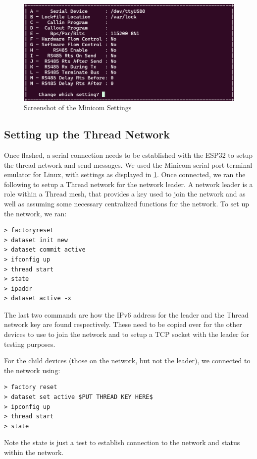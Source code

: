 \documentclass[letterpaper,twocolumn,10pt]{article}
\begin{document}
\begin{figure}
    \centering
    \includegraphics[width=0.75\linewidth]{Figures/minicom_screenshot.png}
    \caption{Screenshot of the Minicom Settings}
    \label{fig:minicom}
\end{figure}

\subsection{Setting up the Thread Network}

Once flashed, a serial connection needs to be established with the ESP32 to setup the thread network and send messages. We used the Minicom serial port terminal emulator for Linux, with settings as displayed in \ref{fig:minicom}. Once connected, we ran the following to setup a Thread network for the network leader. A network leader is a role within a Thread mesh, that provides a key used to join the network and as well as assuming some necessary centralized functions for the network. To set up the network, we ran:
\begin{lstlisting}
> factoryreset
> dataset init new
> dataset commit active
> ifconfig up
> thread start 
> state
> ipaddr
> dataset active -x
\end{lstlisting}

The last two commands are how the IPv6 address for the leader and the Thread network key are found respectively. These need to be copied over for the other devices to use to join the network and to setup a TCP socket with the leader for testing purposes.

For the child devices (those on the network, but not the leader), we connected to the network using:

\begin{lstlisting}
> factory reset
> dataset set active $PUT THREAD KEY HERE$
> ipconfig up
> thread start
> state
\end{lstlisting}

Note the state is just a test to establish connection to the network and status within the network.
\end{document}
